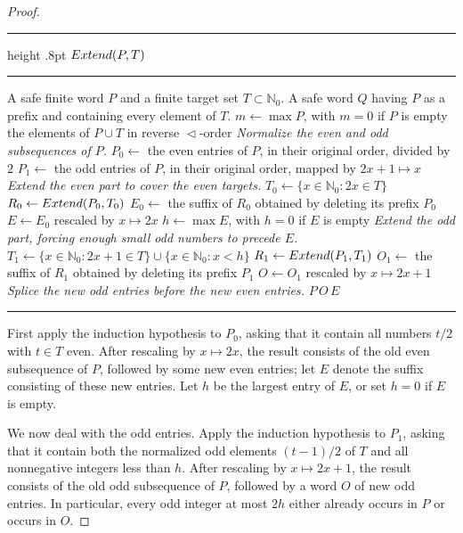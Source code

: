 \documentclass[10pt,a4paper]{amsart}
\newcommand{\NN}{\mathbb N}
\newcommand{\bits}{\mathrel{\triangleleft}}
\begin{document}
\begin{proof}
\newpage
\begin{algorithm}[H]
\small
\hrule height .8pt
\kern 3pt
\noindent$\textsc{Extend}(P,T)$\par
\kern 3pt
\hrule
\begin{algorithmic}[1]
\Require A safe finite word $P$ and a finite target set $T\subset\NN_0$.
\Ensure A safe word $Q$ having $P$ as a prefix and containing every element of $T$.
\State $m\gets\max P$, with $m=0$ if $P$ is empty
  \State \Return the elements of $P\cup T$ in reverse $\bits$-order
\EndIf
\Statex \textit{Normalize the even and odd subsequences of $P$.}
\State $P_0\gets$ the even entries of $P$, in their original order, divided by $2$
\State $P_1\gets$ the odd entries of $P$, in their original order, mapped by $2x+1\mapsto x$
\Statex \textit{Extend the even part to cover the even targets.}
\State $T_0\gets\{x\in\NN_0:2x\in T\}$
\State $R_0\gets\Call{Extend}{P_0,T_0}$
\State $E_0\gets$ the suffix of $R_0$ obtained by deleting its prefix $P_0$
\State $E\gets E_0$ rescaled by $x\mapsto2x$
\State $h\gets\max E$, with $h=0$ if $E$ is empty
\Statex \textit{Extend the odd part, forcing enough small odd numbers to precede $E$.}
\State $T_1\gets\{x\in\NN_0:2x+1\in T\}\cup\{x\in\NN_0:x<h\}$
\State $R_1\gets\Call{Extend}{P_1,T_1}$
\State $O_1\gets$ the suffix of $R_1$ obtained by deleting its prefix $P_1$
\State $O\gets O_1$ rescaled by $x\mapsto2x+1$
\Statex \textit{Splice the new odd entries before the new even entries.}
\State \Return $P\,O\,E$
\end{algorithmic}
\hrule
\caption[Safe extension procedure $\textsc{Extend}(P,T)$]{%
The recursive construction used in the proof. The two recursive calls are on
words whose largest entries are strictly smaller than $m$. The extra targets
$x<h$ in the odd call force every odd integer at most $2h$ which is not already
in $P$ to be placed before the new even block $E$; doing this prevents
mixed-parity 4APs from forming.}\label{alg:extend}
\end{algorithm}

First apply the induction hypothesis to $P_0$, asking that it contain all
numbers $t/2$ with $t\in T$ even. After rescaling by $x\mapsto2x$, the result
consists of the old even subsequence of $P$, followed by some new even entries;
let $E$ denote the suffix consisting of these new entries. Let $h$ be the
largest entry of $E$, or set $h=0$ if $E$ is empty.

We now deal with the odd entries. Apply the induction hypothesis to $P_1$,
asking that it contain both the normalized odd elements $(t-1)/2$ of $T$ and all
nonnegative integers less than $h$. After rescaling by $x\mapsto2x+1$, the
result consists of the old odd subsequence of $P$, followed by a word $O$ of new
odd entries. In particular, every odd integer at most $2h$ either already occurs
in $P$ or occurs in $O$.


\end{proof}
\end{document}
